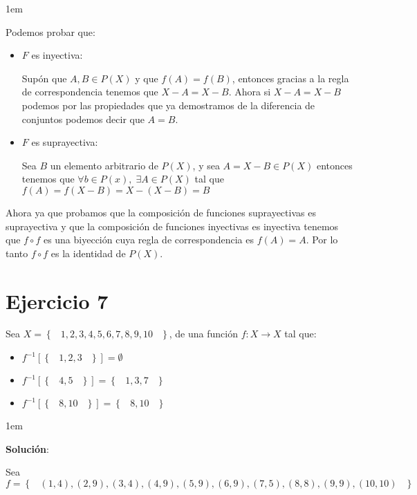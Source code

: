 \documentclass[12pt, fleqn]{article}                             %
\newenvironment{SmallIndentation}[1][0.75em]                    %
    {\begin{adjustwidth}{#1}{}\begin{footnotesize}}                 %
    {\end{footnotesize}\end{adjustwidth}}                           %
\DeclareMathOperator \Space {\quad}                             %
\DeclareMathOperator \MiniSpace {\;}                            %
\newcommand{\Set}[1]{\left\{ \MiniSpace #1 \MiniSpace \right\}} %
\begin{document}
\begin{SmallIndentation}[1em]
        Podemos probar que:
        \begin{itemize}
            \item $F$ es inyectiva:

                Supón que $A,B \in P(X)$ y que $f(A) = f(B)$, entonces gracias a la regla de 
                correspondencia tenemos que $X-A = X-B$.
                Ahora si $X-A = X-B$ podemos por las propiedades que ya demostramos de la diferencia de
                conjuntos podemos decir que $A = B$.

            \item $F$ es suprayectiva:

                Sea $B$ un elemento arbitrario de $P(X)$, y sea $A = X-B \in P(X)$ entonces
                tenemos que $\forall b \in P(x), \; \exists A \in P(X)$ tal que
                $f(A) = f(X-B)= X-(X-B) = B$

        \end{itemize}

        Ahora ya que probamos que la composición de funciones suprayectivas es suprayectiva y que la
        composición de funciones inyectivas es inyectiva tenemos que $f \circ f$ es una biyección cuya
        regla de correspondencia es $f(A) = A$. Por lo tanto $f \circ f$ es la identidad de $P(X)$.


    \end{SmallIndentation}
                



\section{Ejercicio 7}

    Sea $X = \Set{1, 2, 3, 4, 5, 6, 7, 8, 9, 10}$, de una función $f : X \to X$ tal que:
    \begin{itemize}
        \item $f^{-1}[\Set{1,2,3}] = \emptyset$
        \item $f^{-1}[\Set{4, 5}] =  \Set{1,3,7}$
        \item $f^{-1}[\Set{8, 10}] = \Set{8, 10}$
    \end{itemize}

    \begin{SmallIndentation}[1em]
        \textbf{Solución}:
        
        Sea $f = \Set{
                        (1, 4),
                        (2, 9),
                        (3, 4),
                        (4, 9),
                        (5, 9),
                        (6, 9),
                        (7, 5),
                        (8, 8),
                        (9, 9),
                        (10,10)}$

    \end{SmallIndentation}
\end{document}
